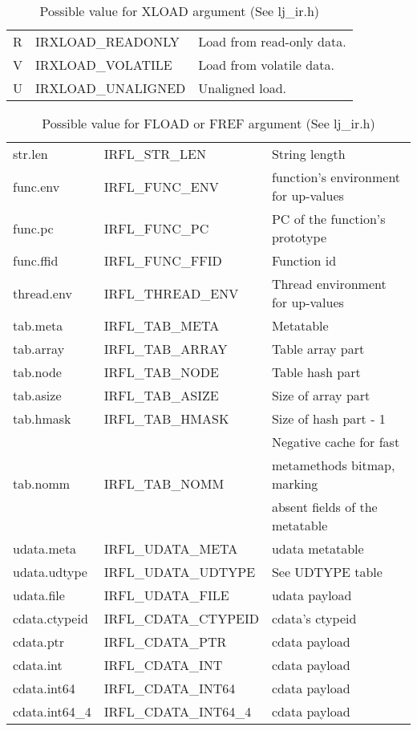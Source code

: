 \begin{table}[H]
\centering
\caption{
  Possible value for XLOAD argument (See lj\_ir.h)
}
\label{tab:dump-xload}
\begin{tabular}{|l|l|l|}
\hline
R & IRXLOAD\_READONLY  & Load from read-only data.\\
V & IRXLOAD\_VOLATILE  & Load from volatile data.\\
U & IRXLOAD\_UNALIGNED & Unaligned load.\\
\hline
\end{tabular}
\end{table}

\begin{table}[H]
\centering
\caption{
  Possible value for FLOAD or FREF argument (See lj\_ir.h)
}
\label{tab:dump-fload-fref}
\begin{tabular}{|l|l|l|}
\hline
str.len        & IRFL\_STR\_LEN        & String length \\
func.env       & IRFL\_FUNC\_ENV       & function's environment for up-values \\
func.pc        & IRFL\_FUNC\_PC        & PC of the function's prototype \\
func.ffid      & IRFL\_FUNC\_FFID      & Function id \\
thread.env     & IRFL\_THREAD\_ENV     & Thread environment for up-values \\
tab.meta       & IRFL\_TAB\_META       & Metatable \\
tab.array      & IRFL\_TAB\_ARRAY      & Table array part \\
tab.node       & IRFL\_TAB\_NODE       & Table hash part \\
tab.asize      & IRFL\_TAB\_ASIZE      & Size of array part\\
tab.hmask      & IRFL\_TAB\_HMASK      & Size of hash part - 1\\\hline
\multirow{3}{*}{tab.nomm} & \multirow{3}{*}{IRFL\_TAB\_NOMM} & Negative cache for fast \\
& & metamethods bitmap, marking\\
& & absent fields of the metatable\\\hline
udata.meta     & IRFL\_UDATA\_META     & udata metatable\\
udata.udtype   & IRFL\_UDATA\_UDTYPE   & See UDTYPE table\\
udata.file     & IRFL\_UDATA\_FILE     & udata payload \\
cdata.ctypeid  & IRFL\_CDATA\_CTYPEID  & cdata's ctypeid\\
cdata.ptr      & IRFL\_CDATA\_PTR      & cdata payload \\
cdata.int      & IRFL\_CDATA\_INT      & cdata payload \\
cdata.int64    & IRFL\_CDATA\_INT64    & cdata payload \\
cdata.int64\_4 & IRFL\_CDATA\_INT64\_4 & cdata payload \\
\hline
\end{tabular}
\end{table}

